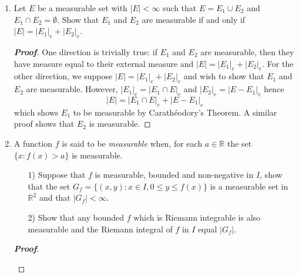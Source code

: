 \documentclass[12pt,leqno]{book}
\theoremstyle{definition}
\newcommand{\R}{\mathbb{R}}
\newenvironment{Proof}{\begin{proof}[\textnormal{\textbf{Proof}}]}{\end{proof}}
\begin{document}
\begin{enumerate}
\begin{Proof}
\begin{description}
We now have a partition of $I$: \[\{I_1,I_2,\hdots,I_n,J_1,J_2,\hdots,J_m\}=\{[x_0,x_1],[x_1,x_2],\hdots,[x_{k-1},x_k]\}\] Before evaluating the Riemann sum on this partition, notice that $O_f(I_i)\leq2\|f\|$ by the triangle inequality.  The Riemann sum on this partition is given by \begin{align*}\sum_{i=1}^k|f(x_i)-f(x_{i-1})|(x_i-x_{i-1})&\leq\sum_{i=1}^kO_f([x_{i-1},x_i])(x_i-x_{i-1})\\&=\sum_{i=1}^nO_f(I_i)|I_i|+\sum_{i=1}^mO_f(J_i)|J_i|\\&\leq\sum_{i=1}^n2\|f\||I_i|+\sum_{i=1}^m\delta|J_i|\\&=2\|f\|\sum_{i=1}^n|I_i|+\delta|I|\\&=2\|f\|\delta+\delta|I|\\&=\epsilon\end{align*} Thus $f$ is integrable on $I$.
 \end{description}
\end{Proof}
\item Let $E$ be a measurable set with $|E|<\infty$ such that $E=E_1\cup E_2$ and $E_1\cap E_2=\emptyset$. Show that $E_1$ and $E_2$ are measurable if and only if $|E|=|E_1|_e+|E_2|_e$. 
\begin{Proof}
 One direction is trivially true: if $E_1$ and $E_2$ are measurable, then they have measure equal to their external measure and $|E|=|E_1|_e+|E_2|_e$. For the other direction, we suppose $|E|=|E_1|_e+|E_2|_e$ and wish to show that $E_1$ and $E_2$ are measurable. However, $|E_1|_e=|E_1\cap E|_e$ and $|E_2|_e=|E-E_1|_e$ hence \[|E|=|E_1\cap E|_e+|E-E_1|_e\] which shows $E_1$ to be measurable by Carath\'{e}odory's Theorem. A similar proof shows that $E_2$ is measurable.
\end{Proof}
\item A function $f$ is said to be \textit{measurable} when, for each $a\in\R$ the set $\{x:f(x)>a\}$ is measurable.
\begin{enumerate}
 \item [1)] Suppose that $f$ is measurable, bounded and non-negative in $I$, show that the set $G_f=\{(x,y):x\in I,0\leq y\leq f(x)\}$ is a measurable set in $\R^2$ and that $|G_f|<\infty$. 
 \item [2)] Show that any bounded $f$ which is Riemann integrable is also measurable and the Riemann integral of $f$ in $I$ equal $|G_f|$.
\end{enumerate}
 \begin{Proof}
  \begin{enumerate}

\end{enumerate}
\end{Proof}
\end{enumerate}
\end{document}
